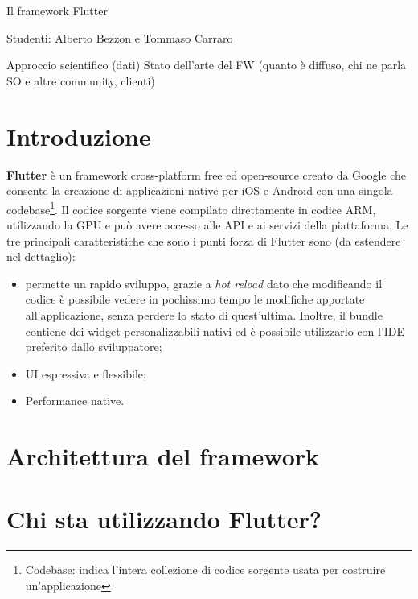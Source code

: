 \documentclass[a4paper]{article}
\begin{document}

\Large
 \begin{center}
Il framework Flutter\\ 
\medskip

\end{center}

\begin{flushleft}
	\large
	Studenti: Alberto Bezzon e Tommaso Carraro\\
\end{flushleft}

\normalsize

Approccio scientifico (dati)
Stato dell'arte del FW (quanto è diffuso, chi ne parla SO e altre community, clienti)

\section*{Introduzione}
\textbf{Flutter} è un framework cross-platform free ed open-source creato da Google che consente la creazione di applicazioni native per iOS e Android con una singola codebase\footnote{Codebase: indica l'intera collezione di codice sorgente usata per costruire un'applicazione}. Il codice sorgente viene compilato direttamente in codice ARM, utilizzando la GPU e può avere accesso alle API e ai servizi della piattaforma.
Le tre principali caratteristiche che sono i punti forza di Flutter sono (da estendere nel dettaglio):
\begin{itemize}
	\item permette un rapido sviluppo, grazie a \textit{hot reload} dato che modificando il codice è possibile vedere in pochissimo tempo le modifiche apportate all'applicazione, senza perdere lo stato di quest'ultima. Inoltre, il bundle contiene dei widget personalizzabili nativi ed è possibile utilizzarlo con l'IDE preferito dallo sviluppatore;
	\item UI espressiva e flessibile;
	\item Performance native.
\end{itemize}

\section*{Architettura del framework}

\section*{Chi sta utilizzando Flutter?}
\end{document}
